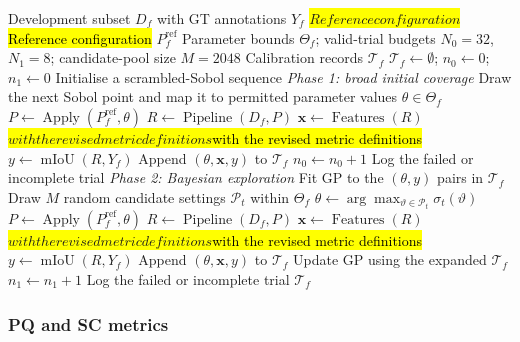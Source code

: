\documentclass[a4paper,fleqn]{cas-dc}
\let\texthl\hl
\renewcommand{\hl}[1]{\ifmmode\colorbox{yellow}{\ensuremath{#1}}\else\texthl{#1}\fi}
\begin{document}
\begin{algorithm}[ht]
\caption{Generating calibration examples through space-filling
sampling and Bayesian exploration}
\label{alg:bo_exploration}
\begin{algorithmic}[1]
\Require Development subset $D_f$ with GT annotations $Y_f$
\Require \hl{Reference configuration} $P_f^{\mathrm{ref}}$
\Require Parameter bounds $\Theta_f$;
         valid-trial budgets $N_0=32$, $N_1=8$;
         candidate-pool size $M=2048$
\Ensure Calibration records $\mathcal{T}_f$
\State $\mathcal{T}_f\gets\emptyset$;
       $n_0\gets0$; $n_1\gets0$
\State Initialise a scrambled-Sobol sequence
\Statex \textit{Phase 1: broad initial coverage}
    \State Draw the next Sobol point and map it to
           permitted parameter values $\theta\in\Theta_f$
    \State $P\gets\operatorname{Apply}
           (P_f^{\mathrm{ref}},\theta)$
    \State $R\gets\operatorname{Pipeline}(D_f,P)$
        \State $\mathbf{x}\gets\operatorname{Features}(R)$ \hl{with the revised metric definitions}
        \State $y\gets\operatorname{mIoU}(R,Y_f)$
        \State Append $(\theta,\mathbf{x},y)$
               to $\mathcal{T}_f$
        \State $n_0\gets n_0+1$
    \Else
        \State Log the failed or incomplete trial
    \EndIf
\EndWhile
\Statex \textit{Phase 2: Bayesian exploration}
\State Fit GP to the $(\theta,y)$ pairs in $\mathcal{T}_f$
    \State Draw $M$ random candidate settings
           $\mathcal{P}_t$ within $\Theta_f$
    \State $\theta\gets
           \arg\max_{\vartheta\in\mathcal{P}_t}
           \sigma_t(\vartheta)$
    \State $P\gets\operatorname{Apply}
           (P_f^{\mathrm{ref}},\theta)$
    \State $R\gets\operatorname{Pipeline}(D_f,P)$
        \State $\mathbf{x}\gets\operatorname{Features}(R)$ \hl{with the revised metric definitions}
        \State $y\gets\operatorname{mIoU}(R,Y_f)$
        \State Append $(\theta,\mathbf{x},y)$
               to $\mathcal{T}_f$
        \State Update GP using the expanded $\mathcal{T}_f$
        \State $n_1\gets n_1+1$
    \Else
        \State Log the failed or incomplete trial
    \EndIf
\EndWhile
\State \Return $\mathcal{T}_f$
\end{algorithmic}
\end{algorithm}

\subsubsection{PQ and SC metrics}
\label{sec:features}
\end{document}
